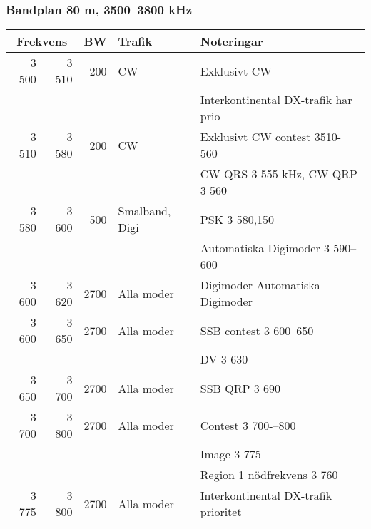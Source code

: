 \begin{landscape}
\subsubsection{Bandplan 80 m, 3500--3800 kHz}
\begin{tabular}{rrrll}
\multicolumn{2}{c}{\textbf{Frekvens}} & \textbf{BW} & \textbf{Trafik} & \textbf{Noteringar} \\ \hline
3 500 & 3 510 & 200  & CW             & Exklusivt CW                         \\ 
      &       &      &                & Interkontinental DX-trafik har prio  \\ \hline
3 510 & 3 580 & 200  & CW             & Exklusivt CW contest 3510-–560       \\ 
      &       &      &                & CW QRS 3 555 kHz, CW QRP 3 560       \\ \hline
3 580 & 3 600 & 500  & Smalband, Digi & PSK 3 580,150                        \\
      &       &      &                & Automatiska Digimoder 3 590--600     \\ \hline
3 600 & 3 620 & 2700 & Alla moder     & Digimoder Automatiska Digimoder      \\ \hline
3 600 & 3 650 & 2700 & Alla moder     & SSB contest 3 600--650               \\
      &       &      &                & DV 3 630                             \\ \hline
3 650 & 3 700 & 2700 & Alla moder     & SSB QRP 3 690                        \\ \hline
3 700 & 3 800 & 2700 & Alla moder     & Contest 3 700-–800                   \\
      &       &      &                & Image 3 775                          \\
      &       &      &                & Region 1 nödfrekvens 3 760           \\ \hline
3 775 & 3 800 & 2700 & Alla moder     & Interkontinental DX-trafik prioritet \\ \hline
\end{tabular}


\end{landscape}
